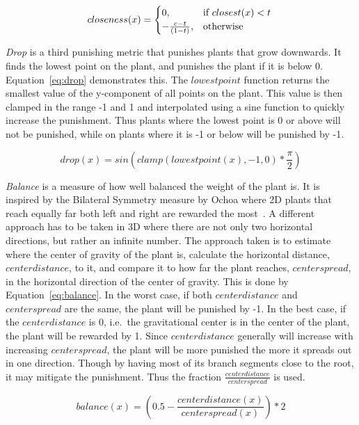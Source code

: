 \begin{equation}
\label{eq:closeness}
    closeness(x) =
    \begin{cases}
        0,& \text{if } closest(x) < t \\
        -\frac{c - t}{(1 - t)},& \text{otherwise}
    \end{cases} \\
\end{equation}

\textit{Drop} is a third punishing metric that punishes plants that grow downwards.
It finds the lowest point on the plant, and punishes the plant if it is below 0.
Equation~\ref{eq:drop} demonstrates this.
The $lowestpoint$ function returns the smallest value of the y-component of all points on the plant.
This value is then clamped in the range -1 and 1 and interpolated using a sine function to quickly increase the punishment.
Thus plants where the lowest point is 0 or above will not be punished, while on plants where it is -1 or below will be punished by -1.

\begin{equation}
\label{eq:drop}
drop(x) = sin(clamp(lowestpoint(x), -1, 0) * \frac{\pi}{2})
\end{equation}

\textit{Balance} is a measure of how well balanced the weight of the plant is.
It is inspired by the Bilateral Symmetry measure by Ochoa where 2D plants that reach equally far both left and right are rewarded the most~\cite{1998Ochoa}.
A different approach has to be taken in 3D where there are not only two horizontal directions, but rather an infinite number.
The approach taken is to estimate where the center of gravity of the plant is, calculate the horizontal distance, $centerdistance$, to it, and compare it to how far the plant reaches, $centerspread$, in the horizontal direction of the center of gravity.
This is done by Equation~\ref{eq:balance}.
In the worst case, if both $centerdistance$ and $centerspread$ are the same, the plant will be punished by -1.
In the best case, if the $centerdistance$ is 0, i.e.\ the gravitational center is in the center of the plant, the plant will be rewarded by 1.
Since $centerdistance$ generally will increase with increasing $centerspread$, the plant will be more punished the more it spreads out in one direction.
Though by having most of its \glspl{branch segment} close to the root, it may mitigate the punishment.
Thus the fraction $\frac{centerdistance}{centerspread}$ is used.

\begin{equation}
\label{eq:balance}
balance(x) = (0.5 - \frac{centerdistance(x)}{centerspread(x)}) * 2
\end{equation}

